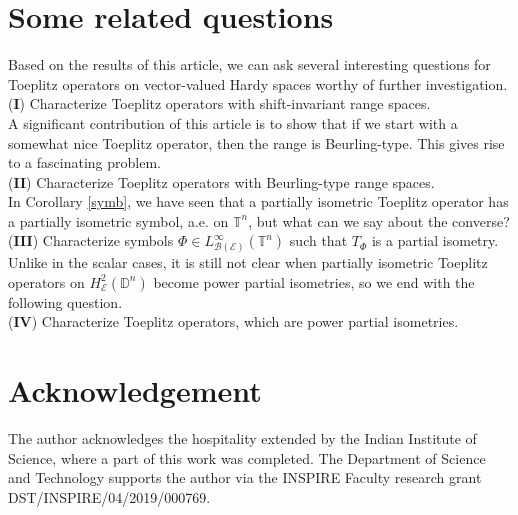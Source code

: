 \documentclass[12pt]{amsart}
\theoremstyle{definition}
\newcommand{\D}{\mathbb{D}}
\newcommand{\1}{{\mbox{\bf 1}}}
\newcommand{\clb}{\mathcal{B}}
\newcommand{\cle}{\mathcal{E}}
\begin{document}
\section{Some related questions}\label{questions}
Based on the results of this article, we can ask several interesting questions for Toeplitz operators on vector-valued Hardy spaces worthy of further investigation. \vspace{1mm}\\
(\textbf{I}) Characterize Toeplitz operators with shift-invariant range spaces. \vspace{1mm}\\
A significant contribution of this article is to show that if we start with a somewhat nice Toeplitz operator, then the range is Beurling-type. This gives rise to a fascinating problem. \vspace{1mm}\\
(\textbf{II}) Characterize Toeplitz operators with Beurling-type range spaces.\vspace{1mm}\\
In Corollary \ref{symb}, we have seen that a partially isometric Toeplitz operator has a partially isometric symbol, a.e. on $\mathbb{T}^n$, but what can we say about the converse? \vspace{1mm}\\
(\textbf{III}) Characterize symbols $\Phi \in L_{\clb(\cle)}^{\infty}(\mathbb{T}^n)$ such that $T_{\Phi}$ is a partial isometry.\vspace{1mm}\\
Unlike in the scalar cases, it is still not clear when partially isometric Toeplitz operators on $H_{\cle}^2(\D^n)$ become power partial isometries, so we end with the following question. \vspace{1mm}\\
(\textbf{IV}) Characterize Toeplitz operators, which are power partial isometries. 

\section*{Acknowledgement}
The author acknowledges the hospitality extended by the Indian Institute of Science, where a part of this work was completed. The Department of Science and Technology supports the author via the INSPIRE Faculty research grant DST/INSPIRE/04/2019/000769.
\end{document}
